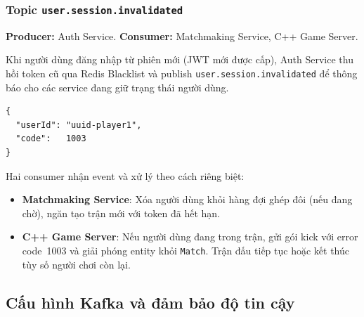 \documentclass[12pt,a4paper]{report}
\newcommand{\topic}[1]{\texttt{\textcolor{micropurple}{#1}}}
\begin{document}
\subsubsection{Topic \texttt{user.session.invalidated}}

\textbf{Producer:} Auth Service. \quad \textbf{Consumer:} Matchmaking Service, C++ Game Server.

Khi người dùng đăng nhập từ phiên mới (JWT mới được cấp), Auth Service thu hồi token cũ
qua Redis Blacklist và publish \topic{user.session.invalidated} để thông báo cho các service
đang giữ trạng thái người dùng.

\begin{lstlisting}[style=jsonStyle,
  caption={Payload topic \texttt{user.session.invalidated} (Auth -> Matchmaking \& C++)}]
{
  "userId": "uuid-player1",
  "code":   1003
}
\end{lstlisting}

Hai consumer nhận event và xử lý theo cách riêng biệt:
\begin{itemize}
  \item \textbf{Matchmaking Service}: Xóa người dùng khỏi hàng đợi ghép đôi (nếu đang
        chờ), ngăn tạo trận mới với token đã hết hạn.
  \item \textbf{C++ Game Server}: Nếu người dùng đang trong trận, gửi gói kick với error
        code~1003 và giải phóng entity khỏi \texttt{Match}. Trận đấu tiếp tục hoặc kết thúc
        tùy số người chơi còn lại.
\end{itemize}

\subsection{Cấu hình Kafka và đảm bảo độ tin cậy}
\end{document}
